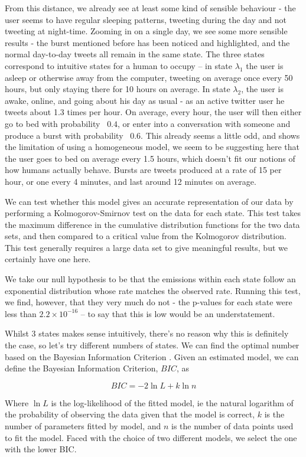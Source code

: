 From this distance, we already see at least some kind of sensible behaviour - the user seems to have regular sleeping patterns, tweeting during the day and not tweeting at night-time. Zooming in on a single day, we see some more sensible results - the burst mentioned before has been noticed and highlighted, and the normal day-to-day tweets all remain in the same state. The three states correspond to intuitive states for a human to occupy -- in state $\lambda_1$ the user is asleep or otherwise away from the computer, tweeting on average once every 50 hours, but only staying there for 10 hours on average. In state $\lambda_2$, the user is awake, online, and going about his day as usual - as an active twitter user he tweets about 1.3 times per hour. On average, every hour, the user will then either go to bed with probability ~$0.4$, or enter into a conversation with someone and produce a burst with probability ~$0.6$. This already seems a little odd, and shows the limitation of using a homogeneous model, we seem to be suggesting here that the user goes to bed on average every 1.5 hours, which doesn't fit our notions of how humans actually behave. Bursts are tweets produced at a rate of 15 per hour, or one every 4 minutes, and last around 12 minutes on average.

We can test whether this model gives an accurate representation of our data by performing a Kolmogorov-Smirnov \cite{mwkstest} test on the data for each state. This test takes the maximum difference in the cumulative distribution functions for the two data sets, and then compared to a critical value from the Kolmogorov distribution. This test generally requires a large data set to give meaningful results, but we certainly have one here. 

We take our null hypothesis to be that the emissions within each state follow an exponential distribution whose rate matches the observed rate. Running this test, we find, however, that they very much do not - the p-values for each state were less than $2.2 \times 10^{-16}$ -- to say that this is low would be an understatement.

Whilst 3 states makes sense intuitively, there's no reason why this is definitely the case, so let's try different numbers of states. We can find the optimal number based on the Bayesian Information Criterion \cite{bic}. Given an estimated model, we can define the Bayesian Information Criterion, $BIC$, as

$$
BIC = -2 \ln L + k \ln n
$$

Where $\ln L$ is the log-likelihood of the fitted model, ie the natural logarithm of the probability of observing the data given that the model is correct, $k$ is the number of parameters fitted by model, and $n$ is the number of data points used to fit the model. Faced with the choice of two different models, we select the one with the lower BIC.

